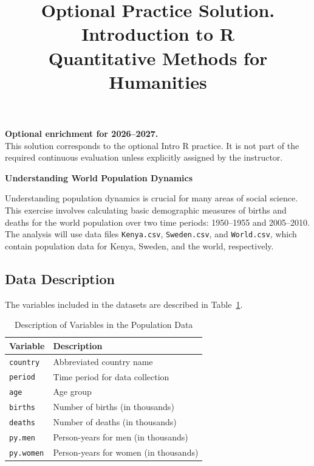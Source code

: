 \documentclass[12pt]{article}
\author{\empty}
\title{Optional Practice Solution. Introduction to R \\ Quantitative Methods for Humanities}
\date{\empty}
\begin{document}
\maketitle

\begin{center}
    \textbf{Optional enrichment for 2026--2027.}\\
    This solution corresponds to the optional Intro R practice. It is not part of the required continuous evaluation unless explicitly assigned by the instructor.
\end{center}
\vspace{0.3cm}

\begin{center}
    \textbf{\large Understanding World Population Dynamics}    
\end{center}

Understanding population dynamics is crucial for many areas of social science. This exercise involves calculating basic demographic measures of births and deaths for the world population over two time periods: 1950--1955 and 2005--2010. The analysis will use data files \texttt{Kenya.csv}, \texttt{Sweden.csv}, and \texttt{World.csv}, which contain population data for Kenya, Sweden, and the world, respectively.

\subsection*{Data Description}

The variables included in the datasets are described in Table~\ref{tab:world-pop-data}.

\begin{table}[h]
\centering
\caption{Description of Variables in the Population Data}\label{tab:world-pop-data}
\begin{tabular}{ll}
\toprule
\textbf{Variable} & \textbf{Description} \\
\midrule
\texttt{country} & Abbreviated country name \\
\texttt{period} & Time period for data collection \\
\texttt{age} & Age group \\
\texttt{births} & Number of births (in thousands) \\
\texttt{deaths} & Number of deaths (in thousands) \\
\texttt{py.men} & Person-years for men (in thousands) \\
\texttt{py.women} & Person-years for women (in thousands) \\
\bottomrule
\end{tabular}
\end{table}
\end{document}
